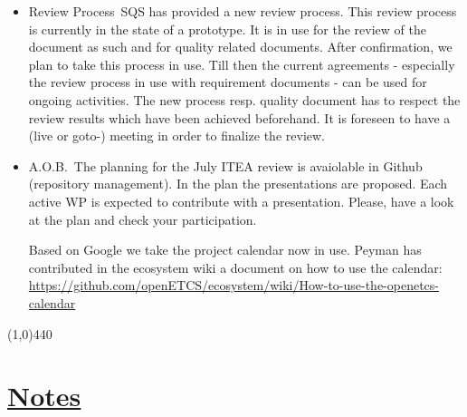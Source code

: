 \documentclass[a4paper, 11pt]{article}
\begin{document}
\begin{itemize}
\item Review Process\
SQS has provided a new review process. This review process is currently in the state of a prototype. It is in use for the review of the document as such and for quality related documents. After confirmation, we plan to take this process in use. Till then the current agreements - especially the review process in use with requirement documents - can be used for ongoing activities.
The new process resp. quality document has to respect the review results which have been achieved beforehand.
It is foreseen to have a (live or goto-) meeting in order to finalize the review.

\item A.O.B.\
The planning for the July ITEA review is avaiolable in Github (repository management). In the plan the presentations are proposed. Each active WP is expected to contribute with a presentation. Please, have a look at the plan and check your participation.

Based on Google we take the project calendar now in use. Peyman has contributed in the ecosystem wiki a document on how to use the calendar:\\
\url{https://github.com/openETCS/ecosystem/wiki/How-to-use-the-openetcs-calendar}

\end{itemize}

\line(1,0){440}
\section{\underline{Notes}}
\end{document}
